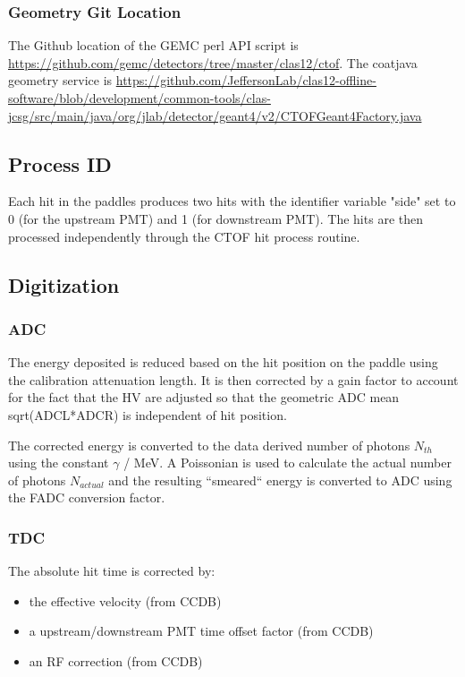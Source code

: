 \subsubsection{Geometry Git Location}
The Github location of the GEMC perl API script is \url{https://github.com/gemc/detectors/tree/master/clas12/ctof}.
The coatjava geometry service is \url{https://github.com/JeffersonLab/clas12-offline-software/blob/development/common-tools/clas-jcsg/src/main/java/org/jlab/detector/geant4/v2/CTOFGeant4Factory.java}

\subsection{Process ID}

Each hit in the paddles produces two hits with the identifier variable "side" set to 0 (for the upstream PMT) and 1 (for downstream PMT).
The hits are then processed independently through the CTOF hit process routine.

\subsection{Digitization}

\subsubsection{ADC}

The energy deposited is reduced based on the hit position on the paddle using the calibration attenuation length. It is then corrected by a gain factor
to account for the fact that the HV are adjusted so that the geometric ADC mean sqrt(ADCL*ADCR) is independent of hit position.

The corrected energy is converted to the data derived number of photons $N_{th}$ using the constant $\gamma$ / MeV. A Poissonian is used to
calculate the actual number of photons $N_{actual}$ and the resulting ``smeared`` energy is converted to ADC using the FADC conversion factor.


\subsubsection{TDC}

The absolute hit time is corrected by:

\begin{itemize}
	\item the effective velocity (from CCDB)
	\item a upstream/downstream PMT time offset factor (from CCDB)
	\item an RF correction (from CCDB)
\end{itemize}

